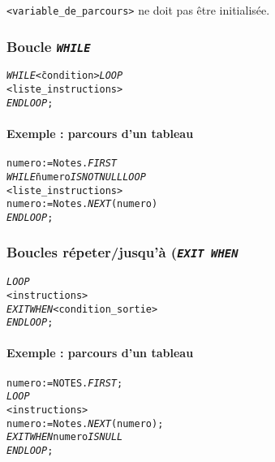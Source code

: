\documentclass[10pt]{article}
\begin{document}
				\texttt{<variable\_de\_parcours>} ne doit pas être initialisée.
			
			\subsubsection{Boucle \emph{\texttt{WHILE}}}
				\begin{alltt}
					\begin{tabbing}
						\emph{WHILE} \= <condition> \emph{LOOP}\\
							\\
						\emph{END LOOP};
					\end{tabbing}
				\end{alltt}
				
				\newpage
				\paragraph{Exemple : parcours d'un tableau}
				\begin{alltt}
					\begin{tabbing}
						numero := Notes.\emph{FIRST}\\
						\emph{WHILE} \= numero \emph{IS NOT NULL LOOP}\\
							\\
							\> numero:=Notes.\emph{NEXT}(numero)\\
						\emph{END LOOP};
					\end{tabbing}
				\end{alltt}
				
			\subsubsection{Boucles répeter/jusqu'à (\emph{\texttt{EXIT WHEN}}}\index{EXI WHEN}
				\begin{alltt}
					\begin{tabbing}
						\emph{LOOP}\=\\
							\><instructions>\\
							\>\emph{EXIT WHEN} <condition_sortie>\\
						\emph{END LOOP};
					\end{tabbing}
				\end{alltt}
				
				\paragraph{Exemple : parcours d'un tableau}
					\begin{alltt}
						\begin{tabbing}
							numero:=NOTES.\emph{FIRST};\\
							\emph{LOOP}\=\\
								\><instructions>\\
								\>numero:=Notes.\emph{NEXT}(numero);\\
								\>\emph{EXIT WHEN} numero \emph{IS NULL}\\
							\emph{END LOOP};
						\end{tabbing}
					\end{alltt}
\end{document}
